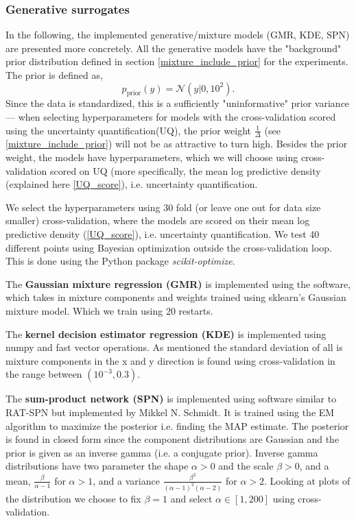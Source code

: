 \subsubsection{Generative surrogates}
In the following, the implemented generative/mixture models (GMR, KDE, SPN) are presented more
concretely. All the generative models have the "background" prior distribution defined in section
\ref{mixture_include_prior} for the experiments. The prior is defined as, 
$$p_{\text{prior}}(y) = \mathcal{N}(y|0,10^2).$$ Since the data is standardized, this is a
sufficiently "uninformative" prior variance --- when selecting hyperparameters for models with the
cross-validation scored using the uncertainty quantification(UQ), the prior weight
$\frac{1}{\Delta}$ (see \ref{mixture_include_prior}) will not be as attractive to turn high. Besides
the prior weight, the models have hyperparameters, which we will choose using cross-validation
scored on UQ (more specifically, the mean log predictive density (explained here \ref{UQ_score}),
i.e. uncertainty quantification.
\begin{testexample}
  We select the hyperparameters using 30 fold (or leave one out for data size smaller)
  cross-validation, where the models are scored on their mean log predictive density
  (\ref{UQ_score}), i.e. uncertainty quantification. We test 40 different points using Bayesian
  optimization outside the cross-validation loop. This is done using the Python package
  \textit{scikit-optimize}. 
\end{testexample}

The \textbf{Gaussian mixture regression (GMR)} is implemented using the software\cite{GMR}, which takes in
mixture components and weights trained using sklearn's Gaussian mixture model. Which we train using
20 restarts.

The \textbf{kernel decision estimator regression (KDE)} is implemented using numpy and fast vector operations. As
mentioned the standard deviation of all is mixture components in the x and y direction is found
using cross-validation in the range between $(10^{-3}, 0.3)$. 

The \textbf{sum-product network (SPN)} is implemented using software similar to RAT-SPN \cite{RAT_SPN} but
implemented by Mikkel N. Schmidt. It is trained using the EM algorithm to maximize the posterior
i.e. finding the MAP estimate. The posterior is found in closed form since the component
distributions are Gaussian and the prior is given as an inverse gamma (i.e. a conjugate prior).
Inverse gamma distributions have two parameter the shape $\alpha>0$ and the scale $\beta>0$, and a
mean, $\frac{\beta}{\alpha-1}$ for $\alpha >1$, and a variance
$\frac{\beta^2}{(\alpha-1)^2(\alpha-2)}$ for $\alpha >2$. Looking at plots of the distribution we
choose to fix $\beta =1$ and select $\alpha \in [1,200]$ using cross-validation. 

